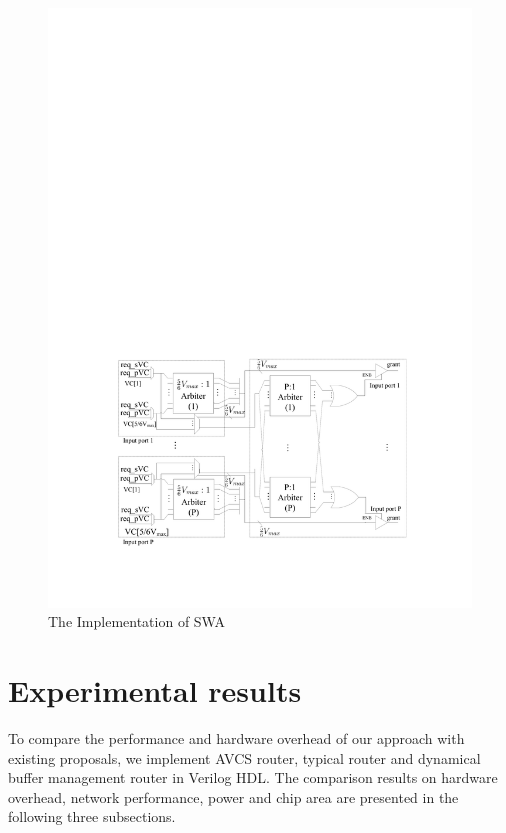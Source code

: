 \documentclass[10pt,conference]{IEEEtran}
\begin{document}
\begin{figure}
\centering\includegraphics[scale=0.3]{figures/swalloc.pdf}
\caption{The Implementation of SWA}\label{swallocator}
\end{figure}

\section{Experimental results}\label{experiemnts}
To compare the performance and hardware overhead of our approach with existing proposals, we implement AVCS router, typical router \cite{DaTo01} and dynamical buffer management router \cite{NPKV06}\cite{4555894} in Verilog HDL. The comparison results on hardware overhead, network performance, power and chip area are presented in the following three subsections.

\end{document}
